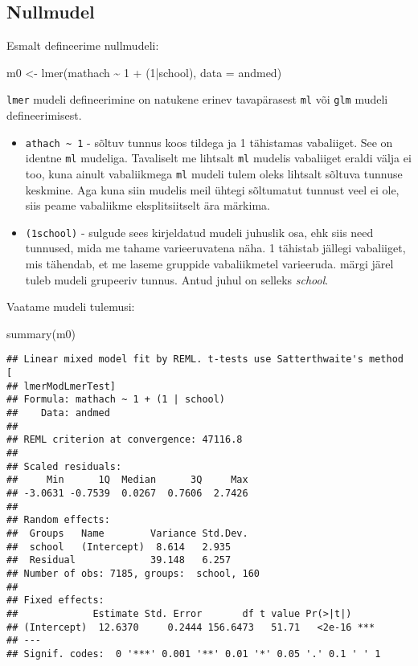 \documentclass[
]{book}
\newenvironment{Shaded}{\begin{snugshade}}{\end{snugshade}}
\newcommand{\AttributeTok}[1]{\textcolor[rgb]{0.77,0.63,0.00}{#1}}
\newcommand{\DecValTok}[1]{\textcolor[rgb]{0.00,0.00,0.81}{#1}}
\newcommand{\FunctionTok}[1]{\textcolor[rgb]{0.00,0.00,0.00}{#1}}
\newcommand{\NormalTok}[1]{#1}
\newcommand{\OtherTok}[1]{\textcolor[rgb]{0.56,0.35,0.01}{#1}}
\newcommand{\SpecialCharTok}[1]{\textcolor[rgb]{0.00,0.00,0.00}{#1}}
\providecommand{\tightlist}{%
  \setlength{\itemsep}{0pt}\setlength{\parskip}{0pt}}
\begin{document}
\hypertarget{nullmudel}{%
\subsection{Nullmudel}\label{nullmudel}}

Esmalt defineerime nullmudeli:

\begin{Shaded}
\begin{Highlighting}[]
\NormalTok{m0 }\OtherTok{\textless{}{-}} \FunctionTok{lmer}\NormalTok{(mathach }\SpecialCharTok{\textasciitilde{}} \DecValTok{1} \SpecialCharTok{+}\NormalTok{ (}\DecValTok{1}\SpecialCharTok{|}\NormalTok{school), }\AttributeTok{data =}\NormalTok{ andmed)}
\end{Highlighting}
\end{Shaded}

\texttt{lmer} mudeli defineerimine on natukene erinev tavapärasest \texttt{ml} või \texttt{glm} mudeli defineerimisest.

\begin{itemize}
\tightlist
\item
  \texttt{athach\ \textasciitilde{}\ 1} - sõltuv tunnus koos tildega ja 1 tähistamas vabaliiget. See on identne \texttt{ml} mudeliga. Tavaliselt me lihtsalt \texttt{ml} mudelis vabaliiget eraldi välja ei too, kuna ainult vabaliikmega \texttt{ml} mudeli tulem oleks lihtsalt sõltuva tunnuse keskmine. Aga kuna siin mudelis meil ühtegi sõltumatut tunnust veel ei ole, siis peame vabaliikme eksplitsiitselt ära märkima.
\item
  \texttt{(1\textbar{}school)} - sulgude sees kirjeldatud mudeli juhuslik osa, ehk siis need tunnused, mida me tahame varieeruvatena näha. 1 tähistab jällegi vabaliiget, mis tähendab, et me laseme gruppide vabaliikmetel varieeruda. \textbar{} märgi järel tuleb mudeli grupeeriv tunnus. Antud juhul on selleks \emph{school}.
\end{itemize}

Vaatame mudeli tulemusi:

\begin{Shaded}
\begin{Highlighting}[]
\FunctionTok{summary}\NormalTok{(m0)}
\end{Highlighting}
\end{Shaded}

\begin{verbatim}
## Linear mixed model fit by REML. t-tests use Satterthwaite's method [
## lmerModLmerTest]
## Formula: mathach ~ 1 + (1 | school)
##    Data: andmed
## 
## REML criterion at convergence: 47116.8
## 
## Scaled residuals: 
##     Min      1Q  Median      3Q     Max 
## -3.0631 -0.7539  0.0267  0.7606  2.7426 
## 
## Random effects:
##  Groups   Name        Variance Std.Dev.
##  school   (Intercept)  8.614   2.935   
##  Residual             39.148   6.257   
## Number of obs: 7185, groups:  school, 160
## 
## Fixed effects:
##             Estimate Std. Error       df t value Pr(>|t|)    
## (Intercept)  12.6370     0.2444 156.6473   51.71   <2e-16 ***
## ---
## Signif. codes:  0 '***' 0.001 '**' 0.01 '*' 0.05 '.' 0.1 ' ' 1
\end{verbatim}
\end{document}
